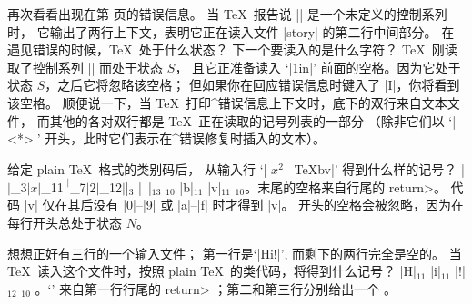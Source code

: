 {%
\ddangerexercise \1再次看看出现在第 \vshippage 页的错误信息。%
当 \TeX\ 报告说 |\vship| 是一个未定义的控制系列时，
它输出了两行上下文，表明它正在读入文件 |story| 的第二行中间部分。%
在遇见错误的时候，\TeX\ 处于什么状态？
下一个要读入的是什么字符？
\answer \TeX\ 刚读取了控制系列 |\vship| 而处于状态 $S$，
且它正准备读入 `|1in|' 前面的空格。因为它处于状态 $S$，之后它将忽略该空格；
但如果你在回应错误信息时键入了 |I\obeyspaces|，你将看到该空格。
顺便说一下，当 \TeX\ 打印^{错误信息上下文}时，底下的双行来自文本文件，
而其他的各对双行\1都是 \TeX\ 正在读取的记号列表的一部分
（除非它们以 `|<*>|' 开头，此时它们表示在^{错误修复}时插入的文本）。

\ddangerexercise 给定 plain \TeX\ 格式的类别码后，
从输入行 `| $x^2$~  \TeX  ^^62^^6|' 得到什么样的记号？
\answer |$|$_{3}$ |x|$_{11}$ |^|$_7$ |2|$_{12}$ |$|$_{3}$ |~|$_{13}$ \]$_{10}$
 |b|$_{11}$ |v|$_{11}$ \]$_{10}$。末尾的空格来自行尾的 \<return>。
代码 |^^6| 仅在其后没有 |0|--|9| 或 |a|--|f| 时才得到 |v|。
开头的空格会被忽略，因为在每行开头总处于状态 $N$。

\ddangerexercise 想想正好有三行的一个输入文件；
第一行是`|Hi!|', 而剩下的两行完全是空的。%
当 \TeX\ 读入这个文件时，按照 plain \TeX\ 的类代码，将得到什么记号？
\answer |H|$_{11}$ |i|$_{11}$ |!|$_{12}$ \]$_{10}$ 
。`\]' 来自第一行行尾的 \<return> ；第二和第三行分别给出一个 。

}
